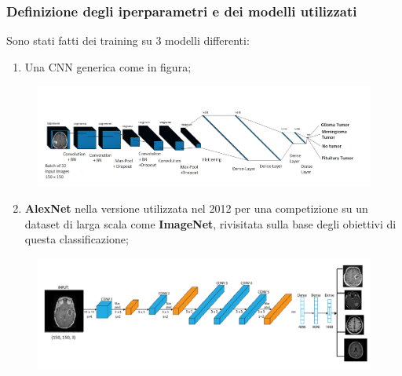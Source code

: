 \documentclass{beamer}
\begin{document}
\begin{frame}
	\frametitle{Definizione degli iperparametri e dei modelli utilizzati}
	Sono stati fatti dei training su 3 modelli differenti:
	\begin{enumerate}
		\item Una CNN generica come in figura;	
	\end{enumerate}
		\begin{figure}
			\includegraphics[width=1.1\textwidth]{BT-first.PNG}
		\end{figure}
		
	
\end{frame}



\begin{frame}
	
	\begin{enumerate}
		\setcounter{enumi}{1}
		\item \textbf{AlexNet} nella versione utilizzata nel 2012 per una competizione su un dataset di larga scala come \textbf{ImageNet}, rivisitata sulla base degli obiettivi di questa classificazione;	
	\end{enumerate}
		\begin{figure}
			\includegraphics[width=1\textwidth]{AlexNet.PNG}
		\end{figure}
		
	
\end{frame}
\end{document}
